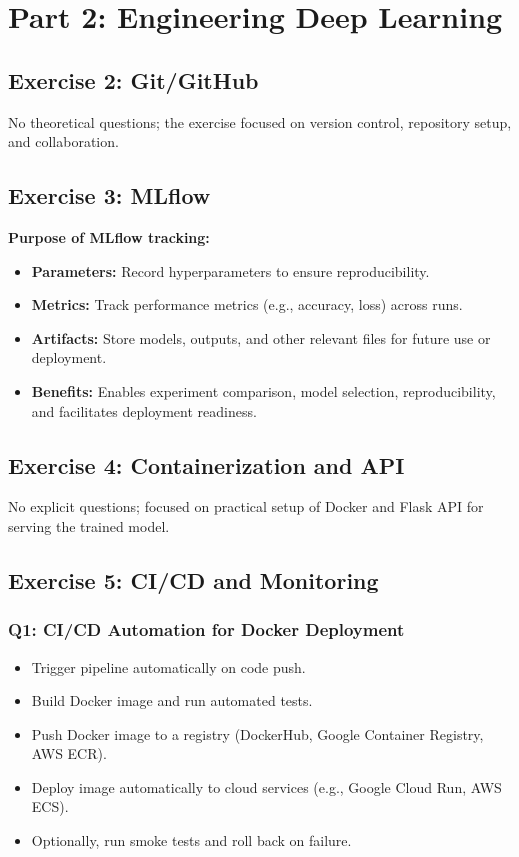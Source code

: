 \documentclass{article}
\begin{document}
\section{Part 2: Engineering Deep Learning}

\subsection{Exercise 2: Git/GitHub}
No theoretical questions; the exercise focused on version control, repository setup, and collaboration.

\subsection{Exercise 3: MLflow}
\textbf{Purpose of MLflow tracking:}
\begin{itemize}[leftmargin=*]
    \item \textbf{Parameters:} Record hyperparameters to ensure reproducibility.
    \item \textbf{Metrics:} Track performance metrics (e.g., accuracy, loss) across runs.
    \item \textbf{Artifacts:} Store models, outputs, and other relevant files for future use or deployment.
    \item \textbf{Benefits:} Enables experiment comparison, model selection, reproducibility, and facilitates deployment readiness.
\end{itemize}

\subsection{Exercise 4: Containerization and API}
No explicit questions; focused on practical setup of Docker and Flask API for serving the trained model.

\subsection{Exercise 5: CI/CD and Monitoring}

\subsubsection{Q1: CI/CD Automation for Docker Deployment}
\begin{itemize}[leftmargin=*]
    \item Trigger pipeline automatically on code push.
    \item Build Docker image and run automated tests.
    \item Push Docker image to a registry (DockerHub, Google Container Registry, AWS ECR).
    \item Deploy image automatically to cloud services (e.g., Google Cloud Run, AWS ECS).
    \item Optionally, run smoke tests and roll back on failure.
\end{itemize}
\end{document}
